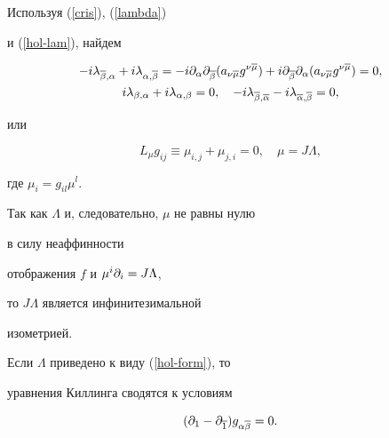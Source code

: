 \begin{pf} Используя (\ref{cris}), (\ref{lambda})


и (\ref{hol-lam}), найдем


\begin{gather*}


-i\lambda_{\ol\beta,\alpha} +i\lambda_{\alpha,\ol\beta} =


-i \pl{\alpha}\pl{\ol\beta} (a_{\nu\ol\mu} g^{\nu\ol\mu})+


i \pl{\ol\beta}\pl{\alpha} (a_{\nu\ol\mu} g^{\nu\ol\mu})=0,\\


i\lambda_{\beta,\alpha} + i\lambda_{\alpha,\beta} = 0, \quad


-i\lambda_{\ol\beta,\ol\alpha} - i\lambda_{\ol\alpha,\ol\beta} = 0,


\end{gather*}


или


\begin{equation}


\label{killing}


L_\mu g_{ij} \equiv \mu_{i,j} + \mu_{j,i} =0, \quad


\mu=J\Lambda,


\end{equation}


где $\mu_i =g_{il} \mu^l$.


Так как $\Lambda$ и, следовательно, $\mu$ не равны нулю


в силу неаффинности


отображения $f$ и $\mu^i\partial_ i = J\Lambda$,


то $J \Lambda$ является инфинитезимальной


изометрией.


\end{pf}





Если $\Lambda$ приведено к виду (\ref{hol-form}), то


уравнения Киллинга сводятся к условиям


\begin{equation}


\label{nondep1}


(\pl1 -\pl{\ol 1}) g_{\alpha\ol\beta} = 0.


\end{equation}






